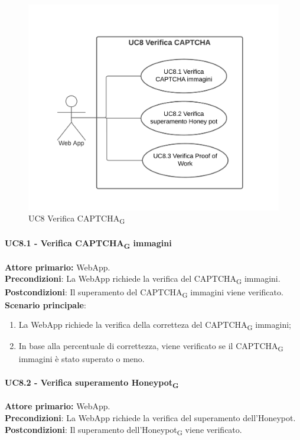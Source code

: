 \begin{figure}[H]
    \centering
    \includegraphics[scale=0.6]{img/verifica_captcha.png}
    \caption{UC8 Verifica CAPTCHA\textsubscript{G}}
\end{figure}

\paragraph{UC8.1 - Verifica CAPTCHA\textsubscript{G} immagini}
\textbf{Attore primario:} WebApp.\\
\textbf{Precondizioni}: La WebApp richiede la verifica del CAPTCHA\textsubscript{G} immagini.\\
\textbf{Postcondizioni}: Il superamento del CAPTCHA\textsubscript{G} immagini viene verificato.\\

\textbf{Scenario principale}:
\begin{enumerate}
    \item La WebApp richiede la verifica della corretteza del CAPTCHA\textsubscript{G} immagini;
    \item In base alla percentuale di correttezza, viene verificato se il CAPTCHA\textsubscript{G} immagini è stato superato o meno.
\end{enumerate}

\paragraph{UC8.2 - Verifica superamento Honeypot\textsubscript{G}}
\textbf{Attore primario:} WebApp.\\
\textbf{Precondizioni}: La WebApp richiede la verifica del superamento dell'Honeypot.\\
\textbf{Postcondizioni}: Il superamento dell'Honeypot\textsubscript{G} viene verificato.\\

